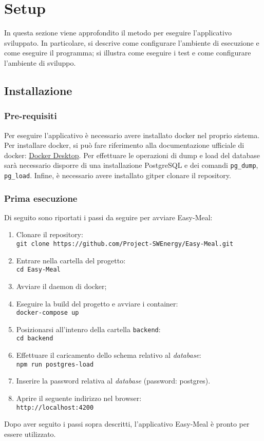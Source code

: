 \section{Setup}
In questa sezione viene approfondito il metodo per eseguire l'applicativo
sviluppato. In particolare, si descrive come configurare l'ambiente di
esecuzione e come eseguire il programma; si illustra come eseguire i test e come
configurare l'ambiente di sviluppo.


\subsection{Installazione}


\subsubsection{Pre-requisiti}
Per eseguire l'applicativo è necessario avere installato docker nel proprio
sistema. Per installare docker, si può fare riferimento alla documentazione
ufficiale di docker:
\href{https://www.docker.com/products/docker-desktop/}{Docker Desktop}.
Per effettuare le operazioni di dump e load del database sarà necessario disporre di una installazione PostgreSQL e dei comandi \texttt{pg\_dump}, \texttt{pg\_load}.
Infine, è necessario avere installato git\g per clonare il repository.


\subsubsection{Prima esecuzione}
Di seguito sono riportati i passi da seguire per avviare Easy-Meal:
\begin{enumerate}
	\item Clonare il repository\g: \\
		\texttt{git clone https://github.com/Project-SWEnergy/Easy-Meal.git}
	\item Entrare nella cartella del progetto: \\
		\texttt{cd Easy-Meal}
	\item Avviare il daemon di docker;
	\item Eseguire la build del progetto e avviare i container: \\
		\texttt{docker-compose up}
	\item Posizionarsi all'intenro della cartella \texttt{backend}:\\
		\texttt{cd backend}
	\item Effettuare il caricamento dello schema relativo al \textit{database}:\\
		\texttt{npm run postgres-load}
	\item Inserire la password relativa al \textit{database} (password:
		postgres).
	\item Aprire il seguente indirizzo nel browser: \\ 
		\texttt{http://localhost:4200}
\end{enumerate}
Dopo aver seguito i passi sopra descritti, l'applicativo Easy-Meal è pronto per essere utilizzato. 


